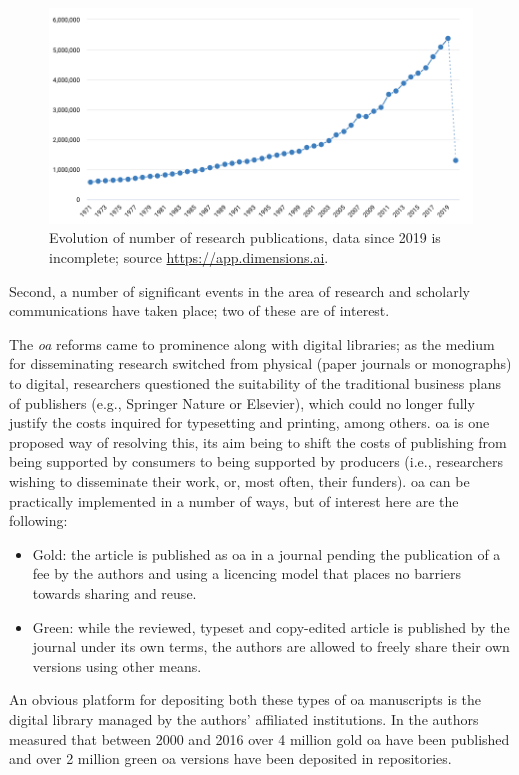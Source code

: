 \begin{figure}[ht!]
\centering
  \includegraphics[width=1\linewidth]{figures/publications.png}  
  \caption{Evolution of number of research publications, data since 2019 is incomplete; source \url{https://app.dimensions.ai}.}
  \label{fig:nopublications}
\end{figure}

Second, a number of significant events in the area of research and scholarly communications have taken place; two of these are of interest.

The \emph{\gls{oa}} reforms came to prominence along with digital libraries; as the medium for disseminating research switched from physical (paper journals or monographs) to digital, researchers questioned the suitability of the traditional business plans of publishers (e.g., Springer Nature or Elsevier), which could no longer fully justify the costs inquired for typesetting and printing, among others. \gls{oa} is one proposed way of resolving this, its aim being to shift the costs of publishing from being supported by consumers to being supported by producers (i.e., researchers wishing to disseminate their work, or, most often, their funders). \gls{oa} can be practically implemented in a number of ways, but of interest here are the following:
\begin{itemize}
    \item Gold: the article is published as \gls{oa} in a journal pending the publication of a fee by the authors and using a licencing model that places no barriers towards sharing and reuse.
    \item Green: while the reviewed, typeset and copy-edited article is published by the journal under its own terms, the authors are allowed to freely share their own versions using other means.
\end{itemize}
An obvious platform for depositing both these types of \gls{oa} manuscripts is the digital library managed by the authors' affiliated institutions. In \cite{oa} the authors measured that between 2000 and 2016 over 4 million gold \gls{oa} have been published and over 2 million green \gls{oa} versions have been deposited in repositories.

